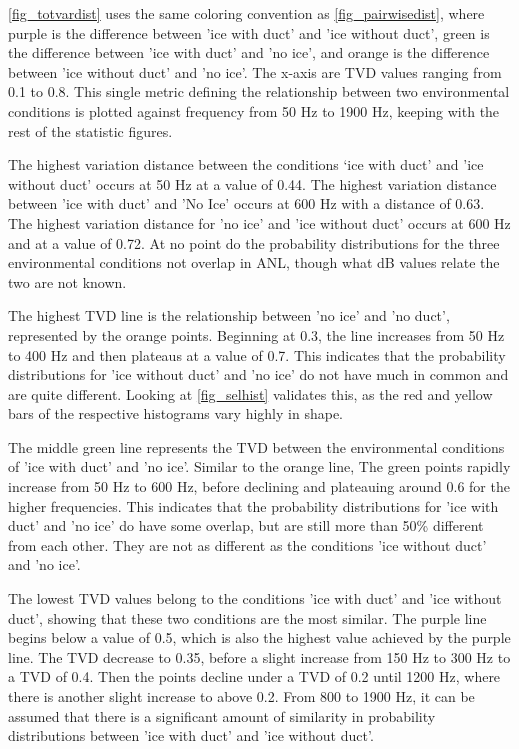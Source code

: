 \autoref{fig_totvardist} uses the same coloring convention as \autoref{fig_pairwisedist}, where purple is the difference between 'ice with duct' and 'ice without duct', green is the difference between 'ice with duct' and 'no ice', and orange is the difference between 'ice without duct' and 'no ice'. The x-axis are TVD values ranging from 0.1 to 0.8. This single metric defining the relationship between two environmental conditions is plotted against frequency from 50 Hz to 1900 Hz, keeping with the rest of the statistic figures.

The highest variation distance between the conditions ‘ice with duct' and 'ice without duct’ occurs at 50 Hz at a value of 0.44. The highest variation distance between 'ice with duct' and 'No Ice' occurs at 600 Hz with a distance of 0.63. The highest variation distance for 'no ice' and 'ice without duct' occurs at 600 Hz and at a value of 0.72. At no point do the probability distributions for the three environmental conditions not overlap in ANL, though what dB values relate the two are not known. 

The highest TVD line is the relationship between 'no ice' and 'no duct', represented by the orange points. Beginning at 0.3, the line increases from 50 Hz to 400 Hz and then plateaus at a value of 0.7. This indicates that the probability distributions for 'ice without duct' and 'no ice' do not have much in common and are quite different. Looking at \autoref{fig_selhist} validates this, as the red and yellow bars of the respective histograms vary highly in shape.

The middle green line represents the TVD between the environmental conditions of 'ice with duct' and 'no ice'. Similar to the orange line, The green points rapidly increase from 50 Hz to 600 Hz, before declining and plateauing around 0.6 for the higher frequencies. This indicates that the probability distributions for 'ice with duct' and 'no ice' do have some overlap, but are still more than 50\% different from each other. They are not as different as the conditions 'ice without duct' and 'no ice'. 

The lowest TVD values belong to the conditions 'ice with duct' and 'ice without duct', showing that these two conditions are the most similar. The purple line begins below a value of 0.5, which is also the highest value achieved by the purple line. The TVD decrease to 0.35, before a slight increase from 150 Hz to 300 Hz to a TVD of 0.4. Then the points decline under a TVD of 0.2 until 1200 Hz, where there is another slight increase to above 0.2. From 800 to 1900 Hz, it can be assumed that there is a significant amount of similarity in probability distributions between 'ice with duct' and 'ice without duct'. 

